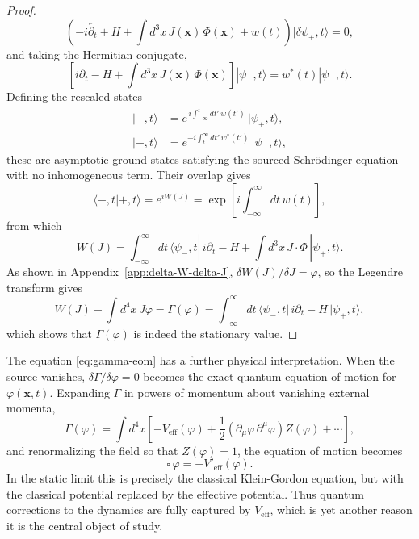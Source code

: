 \begin{proof}
\begin{equation}
		\left(-i\overleftarrow{\partial_t} + H
		+ \int d^3x\,J(\mathbf{x})\,\Phi(\mathbf{x})
		+ w(t)\right)|\delta\psi_+,t\rangle = 0,
	\end{equation}
	and taking the Hermitian conjugate,
	\begin{equation}
		\boxed{\left[i\partial_t - H
				+ \int d^3x\,J(\mathbf{x})\,\Phi(\mathbf{x})\right]|\psi_-,t\rangle
			= w^*(t)|\psi_-,t\rangle.}
	\end{equation}
	Defining the rescaled states
	\begin{align}
		|+,t\rangle & = e^{\,i\int_{-\infty}^{t}dt'\,w(t')}\,|\psi_+,t\rangle, \\
		|-,t\rangle & = e^{-i\int_{t}^{\infty}dt'\,w^*(t')}\,|\psi_-,t\rangle,
	\end{align}
	these are asymptotic ground states satisfying the sourced Schr\"odinger
	equation with no inhomogeneous term. Their overlap gives
	\begin{equation}
		\langle-,t|+,t\rangle = e^{iW(J)}
		= \exp\!\left[i\int_{-\infty}^{\infty}dt\,w(t)\right],
	\end{equation}
	from which
	\begin{equation}
		W(J) = \int_{-\infty}^{\infty}dt\,
		\langle\psi_-,t|\,i\partial_t - H
		+ \int d^3x\,J\cdot\Phi\,|\psi_+,t\rangle.
	\end{equation}
	As shown in Appendix~\ref{app:delta-W-delta-J},
	$\delta W(J)/\delta J = \varphi$, so the Legendre transform gives
	\begin{equation}
		W(J) - \int d^4x\,J\varphi = \Gamma(\varphi)
		= \int_{-\infty}^{\infty}dt\,
		\langle\psi_-,t|\,i\partial_t - H\,|\psi_+,t\rangle,
	\end{equation}
	which shows that $\Gamma(\varphi)$ is indeed the stationary value.
\end{proof}

The equation \eqref{eq:gamma-eom} has a further physical interpretation.
When the source vanishes, $\delta\Gamma/\delta\bar\varphi = 0$ becomes
the exact quantum equation of motion for $\varphi(\mathbf{x},t)$.
Expanding $\Gamma$ in powers of momentum about vanishing external momenta,
\begin{equation}
	\Gamma(\varphi) = \int d^4x\left[
		-V_{\text{eff}}(\varphi)
		+ \frac{1}{2}\left(\partial_\mu\varphi\,\partial^\mu\varphi\right)
		Z(\varphi) + \cdots\right],
\end{equation}
and renormalizing the field so that $Z(\varphi) = 1$, the equation of
motion becomes
\begin{equation}
	\square\,\varphi = -V'_{\text{eff}}(\varphi).
\end{equation}
In the static limit this is precisely the classical Klein-Gordon equation,
but with the classical potential replaced by the effective potential. Thus
quantum corrections to the dynamics are fully captured by $V_{\text{eff}}$,
which is yet another reason it is the central object of study.
